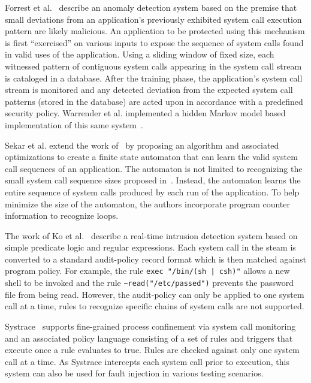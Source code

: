 Forrest et al.~\cite{DBLP:conf/sp/ForrestHSL96} describe
an anomaly detection system based on the premise that small deviations from
an application's previously exhibited system call execution pattern are likely
malicious. An application to be protected using this mechanism is first
``exercised'' on various inputs to expose the
sequence of system calls found in valid uses of the application.
Using a sliding
window of fixed size,
each witnessed pattern of contiguous system calls appearing in the system call stream is cataloged in a database. After the
training phase, the application's system call stream
is monitored and any detected
deviation from the expected system call patterns (stored in the database) are
acted upon in accordance with a predefined security policy.
Warrender et al. implemented a hidden Markov model
based implementation of this same system~\cite{DBLP:conf/sp/WarrenderFP99}.

Sekar et al.\cite{DBLP:conf/sp/SekarBDB01} extend the work
of~\cite{DBLP:conf/sp/ForrestHSL96} by proposing an algorithm and associated
optimizations to create a finite state automaton that can learn the valid system
call sequences of an application.
The automaton is not limited to recognizing the small system call sequence sizes
proposed in~\cite{DBLP:conf/sp/ForrestHSL96}.
Instead, the automaton learns the entire sequence of system calls produced by
each run of the application.
To help minimize the size of the automaton, the authors incorporate program
counter information to recognize loops.

The work of Ko et al.~\cite{DBLP:conf/acsac/KoFL94} describe a real-time intrusion detection system
based on simple predicate logic and regular expressions. Each system call in the
steam is converted to a standard audit-policy record format which is then
matched against program policy. For example,
the rule \lstinline+exec "/bin/(sh | csh)"+ allows a new shell to be invoked and the rule
\lstinline+~read("/etc/passed")+ prevents the password file from being read.
However, the audit-policy can only be applied to
one system call at a time, rules to recognize specific chains of system calls
are not supported.

Systrace~\cite{DBLP:conf/uss/Provos03} supports fine-grained process confinement
via system call monitoring and an associated policy language consisting of a set
of rules and triggers that execute once a rule evaluates to true.
Rules are
checked against only one system call at a time.
As Systrace intercepts each system call prior to execution, this system can also
be used for fault injection in various testing scenarios.


